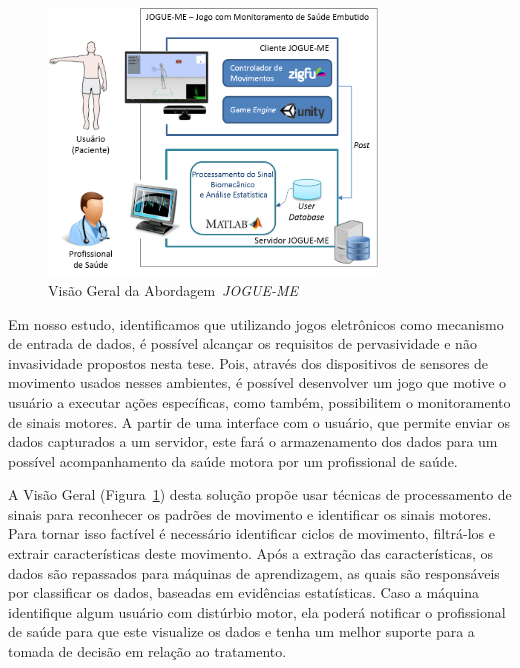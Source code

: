 \begin{figure}[!h]
     \centering
     \includegraphics[width=0.78\textwidth]{./img/visaosistema.png}
     \caption{Visão Geral da Abordagem~\textit{JOGUE-ME}}
     \label{img:visaogeral}
\end{figure}

Em nosso estudo, identificamos que utilizando jogos eletrônicos como mecanismo de entrada de dados, é possível alcançar os requisitos de pervasividade e não invasividade propostos nesta tese. Pois, através dos dispositivos de sensores de movimento usados nesses ambientes, é possível desenvolver um jogo que motive o usuário a executar ações específicas, como também, possibilitem o monitoramento de sinais motores. A partir de uma interface com o usuário, que permite enviar os dados capturados a um servidor, este fará o armazenamento dos dados para um possível acompanhamento da saúde motora por um profissional de saúde.

A Visão Geral (Figura~\ref{img:visaogeral}) desta solução propõe usar técnicas de processamento de sinais para reconhecer os padrões de movimento e identificar os sinais motores. Para tornar isso factível é necessário identificar ciclos de movimento, filtrá-los e extrair características deste movimento. Após a extração das características, os dados são repassados para máquinas de aprendizagem, as quais são responsáveis por classificar os dados, baseadas em evidências estatísticas. Caso a máquina identifique algum usuário com distúrbio motor, ela poderá notificar o profissional de saúde para que este visualize os dados e tenha um melhor suporte para a tomada de decisão em relação ao tratamento.


